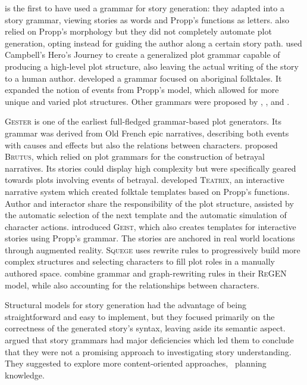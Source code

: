 \citet{lakoff1972structural} is the first to have used a grammar for story generation: they adapted \citet{propp1968morphology} into a story grammar, viewing stories as words and Propp's functions as letters. \citet{grasbon2001morphological} also relied on Propp's morphology but they did not completely automate plot generation, opting instead for guiding the author along a certain story path. \citet{champagnat2010storytelling} used Campbell's Hero's Journey to create a generalized plot grammar capable of producing a high-level plot structure, also leaving the actual writing of the story to a human author. \citet{colby1973partial} developed a grammar focused on aboriginal folktales. It expanded the notion of events from Propp's model, which allowed for more unique and varied plot structures. Other grammars were proposed by \citet{rumelhart1975notes}, \citet{mandler1977remembrance}, and \citet{thorndyke1977cognitive}.

\textsc{Gester} \citep{pemberton1989modular} is one of the earliest full-fledged grammar-based plot generators. Its grammar was derived from Old French epic narratives, describing both events with causes and effects but also the relations between characters. \citet{bringsjord1999artificial} proposed \textsc{Brutus}, which relied on plot grammars for the construction of betrayal narratives. Its stories could display high complexity but were specifically geared towards plots involving events of betrayal. \citet{machado2001real} developed \textsc{Teatrix}, an interactive narrative system which created folktale templates based on Propp's functions. Author and interactor share the responsibility of the plot structure, assisted by the automatic selection of the next template and the automatic simulation of character actions. \citet{spierling2002setting} introduced \textsc{Geist}, which also creates templates for interactive stories using Propp's grammar. The stories are anchored in real world locations through augmented reality. \textsc{Squege} \citep{onuczko2008stop} uses rewrite rules to progressively build more complex structures and selecting characters to fill plot roles in a manually authored space. \citet{kybartas2013analysis} combine grammar and graph-rewriting rules in their \textsc{ReGEN} model, while also accounting for the relationships between characters.

Structural models for story generation had the advantage of being straightforward and easy to implement, but they focused primarily on the correctness of the generated story's syntax, leaving aside its semantic aspect. \citet{black1979evaluation} argued that story grammars had major deficiencies which led them to conclude that they were not a promising approach to investigating story understanding. They suggested to explore more content-oriented approaches, \eg\ planning knowledge.

